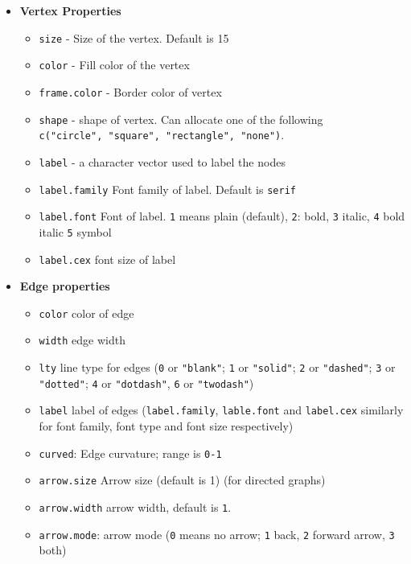 \documentclass[
]{book}
\providecommand{\tightlist}{%
  \setlength{\itemsep}{0pt}\setlength{\parskip}{0pt}}
\begin{document}
\begin{itemize}
\tightlist
\item
  \textbf{Vertex Properties}

  \begin{itemize}
  \tightlist
  \item
    \texttt{size} - Size of the vertex. Default is 15
  \item
    \texttt{color} - Fill color of the vertex
  \item
    \texttt{frame.color} - Border color of vertex
  \item
    \texttt{shape} - shape of vertex. Can allocate one of the following \texttt{c("circle",\ "square",\ "rectangle",\ "none")}.
  \item
    \texttt{label} - a character vector used to label the nodes
  \item
    \texttt{label.family} Font family of label. Default is \texttt{serif}
  \item
    \texttt{label.font} Font of label. \texttt{1} means plain (default), \texttt{2}: bold, \texttt{3} italic, \texttt{4} bold italic \texttt{5} symbol
  \item
    \texttt{label.cex} font size of label
  \end{itemize}
\item
  \textbf{Edge properties}

  \begin{itemize}
  \tightlist
  \item
    \texttt{color} color of edge
  \item
    \texttt{width} edge width
  \item
    \texttt{lty} line type for edges (\texttt{0} or \texttt{"blank"}; \texttt{1} or \texttt{"solid"}; \texttt{2} or \texttt{"dashed"}; \texttt{3} or \texttt{"dotted"}; \texttt{4} or \texttt{"dotdash"}, \texttt{6} or \texttt{"twodash"})
  \item
    \texttt{label} label of edges (\texttt{label.family}, \texttt{lable.font} and \texttt{label.cex} similarly for font family, font type and font size respectively)
  \item
    \texttt{curved}: Edge curvature; range is \texttt{0-1}
  \item
    \texttt{arrow.size} Arrow size (default is 1) (for directed graphs)
  \item
    \texttt{arrow.width} arrow width, default is \texttt{1}.
  \item
    \texttt{arrow.mode}: arrow mode (\texttt{0} means no arrow; \texttt{1} back, \texttt{2} forward arrow, \texttt{3} both)
  \end{itemize}
\end{itemize}
\end{document}

